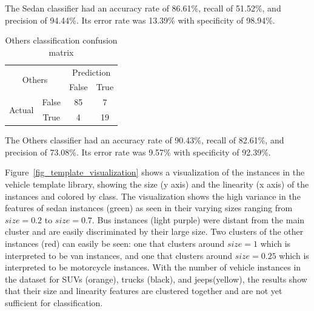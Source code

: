 \documentclass[conference]{IEEEtran}
\begin{document}
The Sedan classifier had an accuracy rate of 86.61\%, recall of 51.52\%, and precision of 94.44\%. Its error rate was 13.39\% with specificity of 98.94\%. 

\begin{table}[]
\centering
\caption{Others classification confusion matrix}
\label{cm:others}
\begin{tabular}{|c|c|c|c|}
\hline
\multicolumn{2}{|c|}{\multirow{2}{*}{Others}} & \multicolumn{2}{c|}{Prediction} \\ \cline{3-4} 
\multicolumn{2}{|c|}{}                       & False          & True           \\ \hline
\multirow{2}{*}{Actual}         & False      & 85             &  7              \\ \cline{2-4} 
                                & True       &  4             & 19             \\ \hline
\end{tabular}
\end{table}

The Others classifier had an accuracy rate of 90.43\%, recall of 82.61\%, and precision of 73.08\%. Its error rate was 9.57\% with specificity of 92.39\%. 


Figure~\ref{fig_template_visualization} shows a visualization of the instances in the vehicle template library, showing the size (y axis) and the linearity (x axis) of the instances and colored by class. The visualization shows the high variance in the features of sedan instances (green) as seen in their varying sizes ranging from $size = 0.2$ to $size = 0.7$. Bus instances (light purple) were distant from the main cluster and are easily discriminated by their large size. Two clusters of the other instances (red) can easily be seen: one that clusters around $size = 1$ which is interpreted to be van instances, and one that clusters around $size = 0.25$ which is interpreted to be motorcycle instances. With the number of vehicle instances in the dataset for SUVs (orange), trucks (black), and jeeps(yellow), the results show that their size and linearity features are clustered together and are not yet sufficient for classification.
\end{document}
